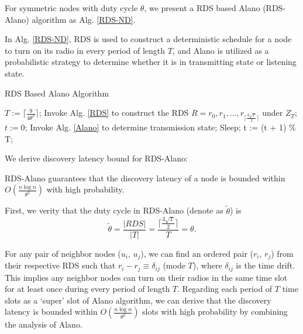 For symmetric nodes with duty cycle $\theta$, we present a RDS based Alano (RDS-Alano) algorithm as Alg. \ref{RDS-ND}.

In Alg. \ref{RDS-ND}, RDS is used to construct a deterministic
schedule for a node to turn on its radio in every period of length $T$,
and Alano is utilized as a probabilistic strategy to
determine whether it is in transmitting state or listening state.

\begin{algorithm}
\caption{RDS Based Alano Algorithm}
\label{RDS-ND}
\begin{algorithmic}[1]
\STATE $T := \lceil \frac{9}{4\theta^{2}} \rceil$;
\STATE Invoke Alg. \ref{RDS} to construct the RDS $R = {r_0, r_1, ...,r_{\lceil \frac{3\sqrt{T}}{2}  \rceil}}$ under $Z_T$;
\STATE $t := 0$;
    		\STATE Invoke Alg. \ref{Alano} to determine transmission state;
	\ELSE
    		\STATE Sleep;
	\ENDIF
	\STATE t := (t + 1) \% T;
\ENDWHILE
\end{algorithmic}
\end{algorithm}


We derive discovery latency bound for RDS-Alano:

\begin{theorem}
\label{theoremRDS}
RDS-Alano guarantees that the discovery latency of a node
is bounded within $O(\frac{n\log n}{\theta^2})$ with high probability.
\end{theorem}

\begin{IEEEproof}
First, we verity that the duty cycle in RDS-Alano (denote as $\widetilde{\theta}$) is
$$
\widetilde{\theta} = \frac{|RDS|}{|T|} = \frac{\lceil \frac{3\sqrt{T}}{2}  \rceil}{T} = \theta.
$$

For any pair of neighbor nodes ($u_i$, $u_j$),
we can find an ordered pair ($r_i$, $r_j$) from their respective RDS
such that $r_i - r_j \equiv \delta_{ij}$ (mode $T$), where $\delta_{ij}$ is the time drift.
This implies any neighbor nodes can turn on their radios in the same time slot for at least once during every period of length $T$. 
Regarding each period of $T$ time slots as a `super' slot of Alano algorithm, we can derive that the discovery latency is bounded within $O(\frac{n\log n}{\theta^2})$ slots with high probability by combining the analysis of Alano.
\end{IEEEproof}

